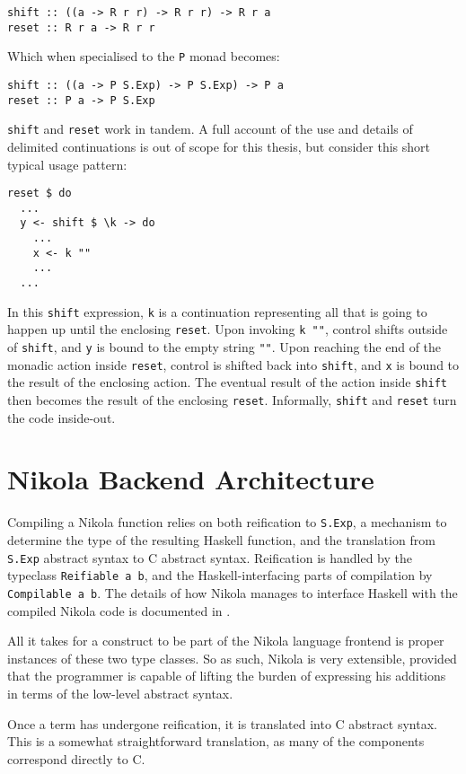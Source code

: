 \begin{lstlisting}
shift :: ((a -> R r r) -> R r r) -> R r a
reset :: R r a -> R r r
\end{lstlisting}

Which when specialised to the \lstinline{P} monad becomes:

\begin{lstlisting}
shift :: ((a -> P S.Exp) -> P S.Exp) -> P a
reset :: P a -> P S.Exp
\end{lstlisting}

\lstinline{shift} and \lstinline{reset} work in tandem. A full account of the use and
details of delimited continuations is out of scope for this thesis, but
consider this short typical usage pattern:

\begin{lstlisting}
reset $ do
  ...
  y <- shift $ \k -> do
    ...
    x <- k ""
    ...
  ...

\end{lstlisting}

In this \lstinline{shift} expression, \lstinline{k} is a continuation representing
all that is going to happen up until the enclosing \lstinline{reset}.  Upon
invoking \lstinline{k ""}, control shifts outside of \lstinline{shift}, and \lstinline{y}
is bound to the empty string \lstinline{""}. Upon reaching the end of the monadic
action inside \lstinline{reset}, control is shifted back into \lstinline{shift}, and
\lstinline{x} is bound to the result of the enclosing action. The eventual result
of the action inside \lstinline{shift} then becomes the result of the enclosing
\lstinline{reset}. Informally, \lstinline{shift} and \lstinline{reset} turn the code
inside-out.

\section{Nikola Backend Architecture}

Compiling a Nikola function relies on both reification to \lstinline{S.Exp}, a
mechanism to determine the type of the resulting Haskell function, and the
translation from \lstinline{S.Exp} abstract syntax to C abstract syntax.
Reification is handled by the typeclass \lstinline{Reifiable a b}, and the
Haskell-interfacing parts of compilation by \lstinline{Compilable a b}.  The
details of how Nikola manages to interface Haskell with the compiled Nikola
code is documented in \cite{mainland2010nikola}.

All it takes for a construct to be part of the Nikola language frontend is
proper instances of these two type classes. So as such, Nikola is very
extensible, provided that the programmer is capable of lifting the burden of
expressing his additions in terms of the low-level abstract syntax.

Once a term has undergone reification, it is translated into C abstract syntax.
This is a somewhat straightforward translation, as many of the components
correspond directly to C.

